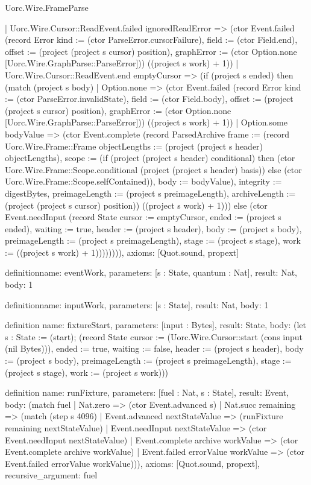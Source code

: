 \begin{lexlean}{Uorc.Wire.FrameParse}
\begin{semanticmodule}
{      | Uorc.Wire.Cursor::ReadEvent.failed ignoredReadError => (ctor Event.failed (record Error {kind := (ctor ParseError.cursorFailure), field := (ctor Field.end), offset := (project (project s cursor) position), graphError := (ctor Option.none [Uorc.Wire.GraphParse::ParseError])}) ((project s work) + 1))
      | Uorc.Wire.Cursor::ReadEvent.end emptyCursor => (if (project s ended) then (match (project s body)
        | Option.none => (ctor Event.failed (record Error {kind := (ctor ParseError.invalidState), field := (ctor Field.body), offset := (project (project s cursor) position), graphError := (ctor Option.none [Uorc.Wire.GraphParse::ParseError])}) ((project s work) + 1))
        | Option.some bodyValue => (ctor Event.complete (record ParsedArchive {frame := (record Uorc.Wire.Frame::Frame {objectLengths := (project (project s header) objectLengths), scope := (if (project (project s header) conditional) then (ctor Uorc.Wire.Frame::Scope.conditional (project (project s header) basis)) else (ctor Uorc.Wire.Frame::Scope.selfContained)), body := bodyValue}), integrity := digestBytes, preimageLength := (project s preimageLength), archiveLength := (project (project s cursor) position)}) ((project s work) + 1))) else (ctor Event.needInput (record State {cursor := emptyCursor, ended := (project s ended), waiting := true, header := (project s header), body := (project s body), preimageLength := (project s preimageLength), stage := (project s stage), work := ((project s work) + 1)}))))))),
  axioms: [Quot.sound, propext]
}

definition{name: eventWork, parameters: [s : State, quantum : Nat], result: Nat, body: 1}

definition{name: inputWork, parameters: [s : State], result: Nat, body: 1}

definition{
  name: fixtureStart,
  parameters: [input : Bytes],
  result: State,
  body: (let s : State := (start); (record State {cursor := (Uorc.Wire.Cursor::start (cons input (nil Bytes))), ended := true, waiting := false, header := (project s header), body := (project s body), preimageLength := (project s preimageLength), stage := (project s stage), work := (project s work)}))
}

definition{
  name: runFixture,
  parameters: [fuel : Nat, s : State],
  result: Event,
  body: (match fuel
    | Nat.zero => (ctor Event.advanced s)
    | Nat.succ remaining => (match (step s 4096)
      | Event.advanced nextStateValue => (runFixture remaining nextStateValue)
      | Event.needInput nextStateValue => (ctor Event.needInput nextStateValue)
      | Event.complete archive workValue => (ctor Event.complete archive workValue)
      | Event.failed errorValue workValue => (ctor Event.failed errorValue workValue))),
  axioms: [Quot.sound, propext],
  recursive_argument: fuel
}


\end{semanticmodule}
\end{lexlean}
